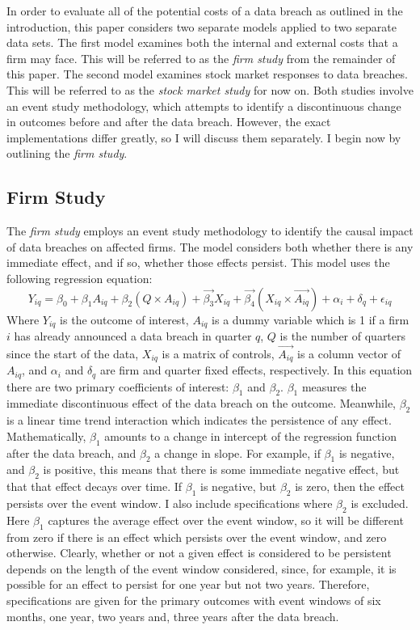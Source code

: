\documentclass[../Main.tex]{subfiles}
\begin{document}
In order to evaluate all of the potential costs of a data breach as outlined in the introduction, this paper considers two separate models applied to two separate data sets. The first model examines both the internal and external costs that a firm may face. This will be referred to as the \textit{firm study} from the remainder of this paper. The second model examines stock market responses to data breaches. This will be referred to as the \textit{stock market study} for now on. Both studies involve an event study methodology, which attempts to identify a discontinuous change in outcomes before and after the data breach. However, the exact implementations differ greatly, so I will discuss them separately. I begin now by outlining the \textit{firm study}.

\subsection{Firm Study}

The \textit{firm study} employs an event study methodology to identify the causal impact of data breaches on affected firms. The model considers both whether there is any immediate effect, and if so, whether those effects persist. This model uses the following regression equation:
\begin{equation}
    \label{firmstudyequation}
    Y_{iq} = \beta_0 + \beta_1 A_{iq} + \beta_2 ( Q \times A_{iq} ) + \vec{\beta_3} X_{iq} + \vec{\beta_4} ( X_{iq} \times \vec{A_{iq}} ) + \alpha_i + \delta_q + \epsilon_{iq}
\end{equation}
Where $Y_{iq}$ is the outcome of interest, $A_{iq}$ is a dummy variable which is 1 if a firm $i$ has already announced a data breach in quarter $q$, $Q$ is the number of quarters since the start of the data, $X_{iq}$ is a matrix of controls, $\vec{A_{iq}}$ is a column vector of $A_{iq}$, and $\alpha_i$ and $\delta_q$ are firm and quarter fixed effects, respectively. In this equation there are two primary coefficients of interest: $\beta_1$ and $\beta_2$. $\beta_1$ measures the immediate discontinuous effect of the data breach on the outcome. Meanwhile, $\beta_2$ is a linear time trend interaction which indicates the persistence of any effect. Mathematically, $\beta_1$ amounts to a change in intercept of the regression function after the data breach, and $\beta_2$ a change in slope. For example, if $\beta_1$ is negative, and $\beta_2$ is positive, this means that there is some immediate negative effect, but that that effect decays over time. If $\beta_1$ is negative, but $\beta_2$ is zero, then the effect persists over the event window. I also include specifications where $\beta_2$ is excluded. Here $\beta_1$ captures the average effect over the event window, so it will be different from zero if there is an effect which persists over the event window, and zero otherwise. Clearly, whether or not a given effect is considered to be persistent depends on the length of the event window considered, since, for example, it is possible for an effect to persist for one year but not two years. Therefore, specifications are given for the primary outcomes with event windows of six months, one year, two years and, three years after the data breach. 
\end{document}
